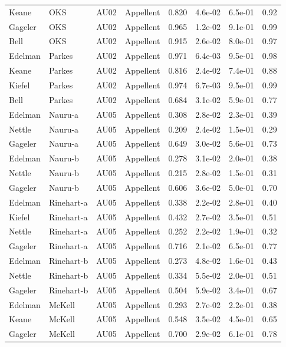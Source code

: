 \documentclass{monashthesis}
\begin{document}
\begin{center}
\begin{longtable}{llllllll}
Keane & OKS & AU02 & Appellent & 0.820 & 4.6e-02 & 6.5e-01 & 0.92 \\
Gageler & OKS & AU02 & Appellent & 0.965 & 1.2e-02 & 9.1e-01 & 0.99 \\
Bell & OKS & AU02 & Appellent & 0.915 & 2.6e-02 & 8.0e-01 & 0.97 \\
Edelman & Parkes & AU02 & Appellent & 0.971 & 6.4e-03 & 9.5e-01 & 0.98 \\
Keane & Parkes & AU02 & Appellent & 0.816 & 2.4e-02 & 7.4e-01 & 0.88 \\
Kiefel & Parkes & AU02 & Appellent & 0.974 & 6.7e-03 & 9.5e-01 & 0.99 \\
Bell & Parkes & AU02 & Appellent & 0.684 & 3.1e-02 & 5.9e-01 & 0.77 \\
Edelman & Nauru-a & AU05 & Appellent & 0.308 & 2.8e-02 & 2.3e-01 & 0.39 \\
Nettle & Nauru-a & AU05 & Appellent & 0.209 & 2.4e-02 & 1.5e-01 & 0.29 \\
Gageler & Nauru-a & AU05 & Appellent & 0.649 & 3.0e-02 & 5.6e-01 & 0.73 \\
Edelman & Nauru-b & AU05 & Appellent & 0.278 & 3.1e-02 & 2.0e-01 & 0.38 \\
Nettle & Nauru-b & AU05 & Appellent & 0.215 & 2.8e-02 & 1.5e-01 & 0.31 \\
Gageler & Nauru-b & AU05 & Appellent & 0.606 & 3.6e-02 & 5.0e-01 & 0.70 \\
Edelman & Rinehart-a & AU05 & Appellent & 0.338 & 2.2e-02 & 2.8e-01 & 0.40 \\
Kiefel & Rinehart-a & AU05 & Appellent & 0.432 & 2.7e-02 & 3.5e-01 & 0.51 \\
Nettle & Rinehart-a & AU05 & Appellent & 0.252 & 2.2e-02 & 1.9e-01 & 0.32 \\
Gageler & Rinehart-a & AU05 & Appellent & 0.716 & 2.1e-02 & 6.5e-01 & 0.77 \\
Edelman & Rinehart-b & AU05 & Appellent & 0.273 & 4.8e-02 & 1.6e-01 & 0.43 \\
Nettle & Rinehart-b & AU05 & Appellent & 0.334 & 5.5e-02 & 2.0e-01 & 0.51 \\
Gageler & Rinehart-b & AU05 & Appellent & 0.504 & 5.9e-02 & 3.4e-01 & 0.67 \\
Edelman & McKell & AU05 & Appellent & 0.293 & 2.7e-02 & 2.2e-01 & 0.38 \\
Keane & McKell & AU05 & Appellent & 0.548 & 3.5e-02 & 4.5e-01 & 0.65 \\
Gageler & McKell & AU05 & Appellent & 0.700 & 2.9e-02 & 6.1e-01 & 0.78 \\

\end{longtable}
\end{center}
\end{document}
